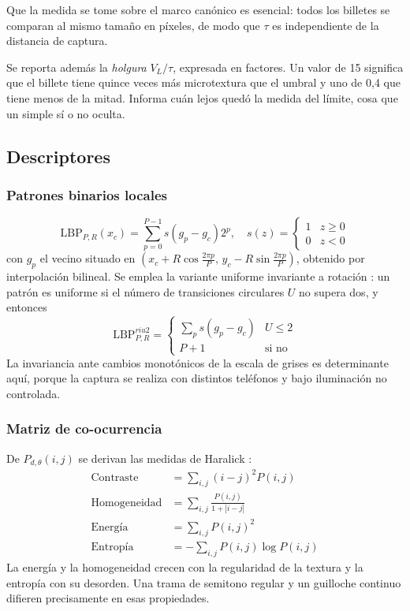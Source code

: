 \documentclass[conference]{IEEEtran}
\begin{document}
Que la medida se tome sobre el marco canónico es esencial: todos los
billetes se comparan al mismo tamaño en píxeles, de modo que $\tau$ es
independiente de la distancia de captura.

Se reporta además la \emph{holgura} $V_L/\tau$, expresada en factores.
Un valor de 15 significa que el billete tiene quince veces más
microtextura que el umbral y uno de 0{,}4 que tiene menos de la mitad.
Informa cuán lejos quedó la medida del límite, cosa que un simple sí o
no oculta.

\subsection{Descriptores}

\subsubsection{Patrones binarios locales}
\begin{equation}
\mathrm{LBP}_{P,R}(x_c) = \sum_{p=0}^{P-1} s(g_p-g_c)2^p,\quad
s(z)=\begin{cases}1 & z\ge0\\ 0 & z<0\end{cases}
\end{equation}
con $g_p$ el vecino situado en
$(x_c+R\cos\frac{2\pi p}{P},\,y_c-R\sin\frac{2\pi p}{P})$, obtenido por
interpolación bilineal. Se emplea la variante uniforme invariante a
rotación \cite{ojala2002}: un patrón es uniforme si el número de
transiciones circulares $U$ no supera dos, y entonces
\begin{equation}
\mathrm{LBP}^{riu2}_{P,R} =
\begin{cases}\sum_p s(g_p-g_c) & U\le2\\ P+1 & \text{si no}\end{cases}
\end{equation}
La invariancia ante cambios monotónicos de la escala de grises es
determinante aquí, porque la captura se realiza con distintos teléfonos
y bajo iluminación no controlada.

\subsubsection{Matriz de co-ocurrencia}
De $P_{d,\theta}(i,j)$ se derivan las medidas de Haralick
\cite{haralick1973}:
\begin{align}
\text{Contraste} &= \sum_{i,j}(i-j)^2P(i,j)\\
\text{Homogeneidad} &= \sum_{i,j}\frac{P(i,j)}{1+|i-j|}\\
\text{Energía} &= \sum_{i,j}P(i,j)^2\\
\text{Entropía} &= -\sum_{i,j}P(i,j)\log P(i,j)
\end{align}
La energía y la homogeneidad crecen con la regularidad de la textura y
la entropía con su desorden. Una trama de semitono regular y un
guilloche continuo difieren precisamente en esas propiedades.
\end{document}
